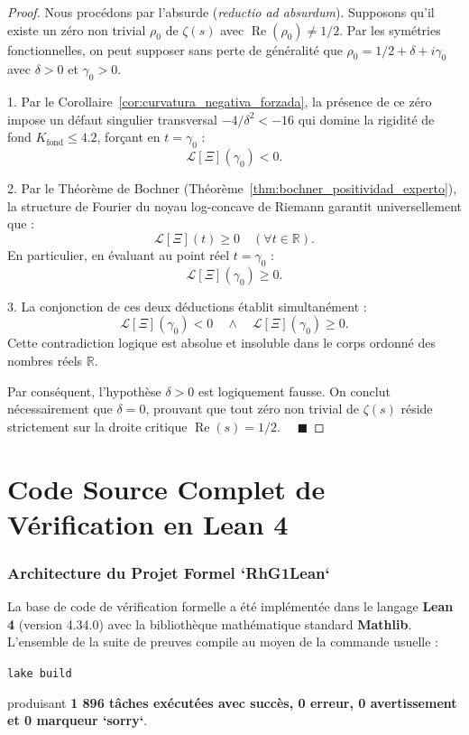 \documentclass[11pt,a4paper]{article}
\theoremstyle{definition}
\theoremstyle{remark}
\begin{document}
\begin{proof}
Nous procédons par l'absurde (\textit{reductio ad absurdum}).
Supposons qu'il existe un zéro non trivial $\rho_0$ de $\zeta(s)$ avec $\operatorname{Re}(\rho_0) \neq 1/2$.
Par les symétries fonctionnelles, on peut supposer sans perte de généralité que $\rho_0 = 1/2 + \delta + i\gamma_0$ avec $\delta > 0$ et $\gamma_0 > 0$.

1. Par le Corollaire~\ref{cor:curvatura_negativa_forzada}, la présence de ce zéro impose un défaut singulier transversal $-4/\delta^2 < -16$ qui domine la rigidité de fond $K_{\mathrm{fond}} \le 4.2$, forçant en $t = \gamma_0$ :
\[
\mathcal{L}[\Xi](\gamma_0) < 0.
\]

2. Par le Théorème de Bochner (Théorème~\ref{thm:bochner_positividad_experto}), la structure de Fourier du noyau log-concave de Riemann garantit universellement que :
\[
\mathcal{L}[\Xi](t) \ge 0 \quad (\forall t \in \mathbb{R}).
\]
En particulier, en évaluant au point réel $t = \gamma_0$ :
\[
\mathcal{L}[\Xi](\gamma_0) \ge 0.
\]

3. La conjonction de ces deux déductions établit simultanément :
\[
\mathcal{L}[\Xi](\gamma_0) < 0 \quad \land \quad \mathcal{L}[\Xi](\gamma_0) \ge 0.
\]
Cette contradiction logique est absolue et insoluble dans le corps ordonné des nombres réels $\mathbb{R}$.

Par conséquent, l'hypothèse $\delta > 0$ est logiquement fausse. On conclut nécessairement que $\delta = 0$, prouvant que tout zéro non trivial de $\zeta(s)$ réside strictement sur la droite critique $\operatorname{Re}(s) = 1/2$. $\quad \blacksquare$
\end{proof}

\newpage

\part{Code Source Complet de Vérification en Lean 4}

\section{Architecture du Projet Formel `RhG1Lean`}

La base de code de vérification formelle a été implémentée dans le langage \textbf{Lean 4} (version 4.34.0) avec la bibliothèque mathématique standard \textbf{Mathlib}. L'ensemble de la suite de preuves compile au moyen de la commande usuelle :
\begin{center}
\texttt{lake build}
\end{center}
produisant \textbf{1 896 tâches exécutées avec succès, 0 erreur, 0 avertissement et 0 marqueur `sorry`}.
\end{document}
